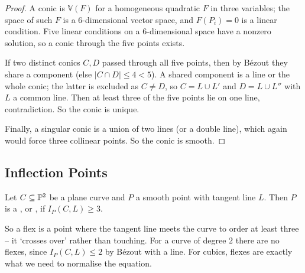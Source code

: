 \documentclass[a4paper]{scrartcl}
\newcommand{\V}{\mathbb{V}}
\begin{document}
\begin{proof}
	A conic is $\V(F)$ for a homogeneous quadratic $F$ in three variables; the space of such $F$ is a $6$-dimensional vector space, and $F(P_i) = 0$ is a linear condition. Five linear conditions on a $6$-dimensional space have a nonzero solution, so a conic through the five points exists.

	If two distinct conics $C, D$ passed through all five points, then by B\'ezout they share a component (else $|C\cap D| \leq 4 < 5$). A shared component is a line or the whole conic; the latter is excluded as $C \neq D$, so $C = L \cup L'$ and $D = L \cup L''$ with $L$ a common line. Then at least three of the five points lie on one line, contradiction. So the conic is unique.

	Finally, a singular conic is a union of two lines (or a double line), which again would force three collinear points. So the conic is smooth.
\end{proof}

\subsection{Inflection Points}

\begin{definition}[Flex]
	Let $C \subseteq \mathbb{P}^2$ be a plane curve and $P$ a smooth point with tangent line $L$. Then $P$ is a , or , if $I_P(C,L) \geq 3$.
\end{definition}

So a flex is a point where the tangent line meets the curve to order at least three -- it `crosses over' rather than touching. For a curve of degree $2$ there are no flexes, since $I_P(C,L) \leq 2$ by B\'ezout with a line. For cubics, flexes are exactly what we need to normalise the equation.
\end{document}
